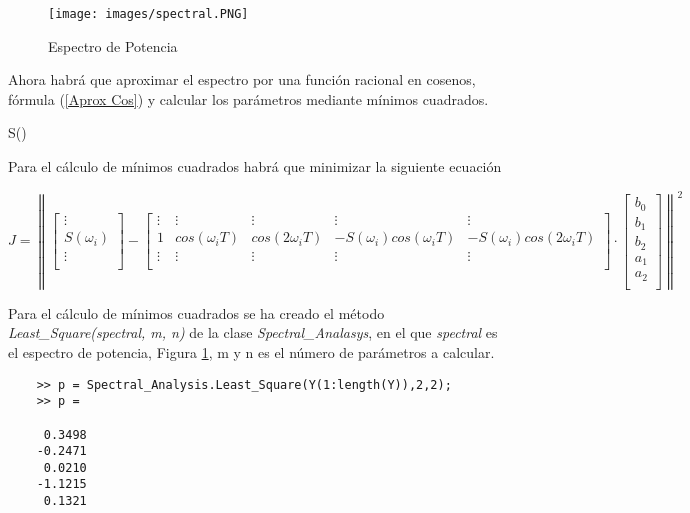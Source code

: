 \documentclass[a4paper, fontsize=11pt]{scrartcl} %
\numberwithin{equation}{section} %
\numberwithin{figure}{section} %
\numberwithin{table}{section} %
\newenvironment{myalign}{\par\nobreak\large\noindent\align}{\endalign} %
\begin{document}
	\begin{figure}[h!]
		\centering
		\texttt{[image: images/spectral.PNG]}
		\caption{Espectro de Potencia}
		\label{Spectral Analysis}
	\end{figure}
	\FloatBarrier
	
	Ahora habrá que aproximar el espectro por una función racional en cosenos, fórmula (\ref{Aprox Cos}) y calcular los parámetros mediante mínimos cuadrados.
	
	\begin{myalign}
		S(\omega) \approx {}
		\label{Aprox Cos}
	\end{myalign}
	
	Para el cálculo de mínimos cuadrados habrá que minimizar la siguiente ecuación
	
	\[ J = \left\| \left[ \begin{array}{c}
	\vdots \\
	S(\omega_i) \\
	\vdots \\
	\end{array} \right] - \left[ \begin{array}{ccccc}
	\vdots & \vdots & \vdots & \vdots & \vdots \\
	1 & cos(\omega_i T) & cos(2 \omega_i T) & -S(\omega_i)cos(\omega_i T) & -S(\omega_i)cos(2\omega_i T) \\
	\vdots & \vdots & \vdots & \vdots & \vdots \\
	\end{array} \right] \cdot \left[ \begin{array}{c}
	b_0 \\
	b_1 \\
	b_2 \\
	a_1 \\
	a_2 \\ 
	\end{array} \right] \right\|^2  \] 
	
	Para el cálculo de mínimos cuadrados se ha creado el método \textit{Least\_Square(spectral, m, n)} de la clase \textit{Spectral\_Analasys}, en el que \textit{spectral} es el espectro de potencia, Figura \ref{Spectral Analysis}, m y n es el número de parámetros a calcular.
	
	\begin{lstlisting}
	>> p = Spectral_Analysis.Least_Square(Y(1:length(Y)),2,2);
	>> p =
	
	 0.3498
	-0.2471
	 0.0210
	-1.1215
	 0.1321
	\end{lstlisting}
	
\end{document}

